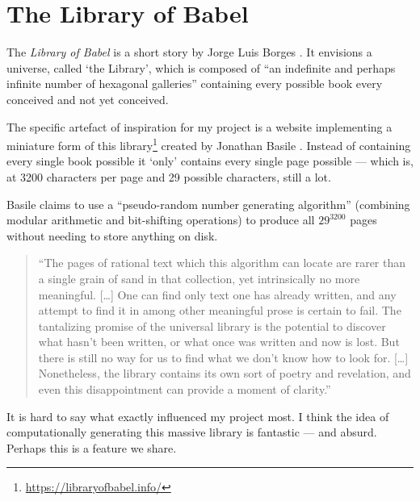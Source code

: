 \section{The Library of Babel}

The \textit{Library of Babel} is a short story by Jorge Luis Borges \autocite{Borges1964}. It envisions a universe, called `the Library', which is composed of ``an indefinite and perhaps infinite number of hexagonal galleries'' containing every possible book every conceived and not yet conceived.

The specific artefact of inspiration for my project is a website implementing a miniature form of this library\footnote{\url{https://libraryofbabel.info/}} created by Jonathan Basile \autocite{Basile2015}. Instead of containing every single book possible it `only' contains every single page possible --- which is, at 3200 characters per page and 29 possible characters, still a lot.

Basile claims to use a ``pseudo-random number generating algorithm'' (combining modular arithmetic and bit-shifting operations) to produce all $29^{3200}$ pages without needing to store anything on disk.

\begin{quotation}
  ``The pages of rational text which this algorithm can locate are rarer than a single grain of sand in that collection, yet intrinsically no more meaningful.
  [\ldots]
  One can find only text one has already written, and any attempt to find it in among other meaningful prose is certain to fail. The tantalizing promise of the universal library is the potential to discover what hasn’t been written, or what once was written and now is lost. But there is still no way for us to find what we don’t know how to look for.
  [\ldots]
  Nonetheless, the library contains its own sort of poetry and revelation, and even this disappointment can provide a moment of clarity.'' 
\end{quotation}

It is hard to say what exactly influenced my project most. I think the idea of computationally generating this massive library is fantastic --- and absurd. Perhaps this is a feature we share.


\stopcontents[chapters]
